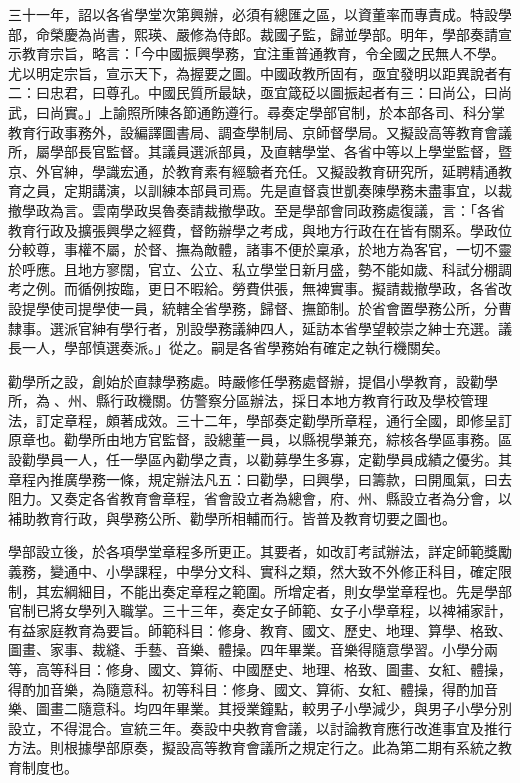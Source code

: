 \begin{pinyinscope}
三十一年，詔以各省學堂次第興辦，必須有總匯之區，以資董率而專責成。特設學部，命榮慶為尚書，熙瑛、嚴修為侍郎。裁國子監，歸並學部。明年，學部奏請宣示教育宗旨，略言：「今中國振興學務，宜注重普通教育，令全國之民無人不學。尤以明定宗旨，宣示天下，為握要之圖。中國政教所固有，亟宜發明以距異說者有二：曰忠君，曰尊孔。中國民質所最缺，亟宜箴砭以圖振起者有三：曰尚公，曰尚武，曰尚實。」上諭照所陳各節通飭遵行。尋奏定學部官制，於本部各司、科分掌教育行政事務外，設編譯圖書局、調查學制局、京師督學局。又擬設高等教育會議所，屬學部長官監督。其議員選派部員，及直轄學堂、各省中等以上學堂監督，暨京、外官紳，學識宏通，於教育素有經驗者充任。又擬設教育研究所，延聘精通教育之員，定期講演，以訓練本部員司焉。先是直督袁世凱奏陳學務未盡事宜，以裁撤學政為言。雲南學政吳魯奏請裁撤學政。至是學部會同政務處復議，言：「各省教育行政及擴張興學之經費，督飭辦學之考成，與地方行政在在皆有關系。學政位分較尊，事權不屬，於督、撫為敵體，諸事不便於稟承，於地方為客官，一切不靈於呼應。且地方寥闊，官立、公立、私立學堂日新月盛，勢不能如歲、科試分棚調考之例。而循例按臨，更日不暇給。勞費供張，無裨實事。擬請裁撤學政，各省改設提學使司提學使一員，統轄全省學務，歸督、撫節制。於省會置學務公所，分曹隸事。選派官紳有學行者，別設學務議紳四人，延訪本省學望較崇之紳士充選。議長一人，學部慎選奏派。」從之。嗣是各省學務始有確定之執行機關矣。

勸學所之設，創始於直隸學務處。時嚴修任學務處督辦，提倡小學教育，設勸學所，為、州、縣行政機關。仿警察分區辦法，採日本地方教育行政及學校管理法，訂定章程，頗著成效。三十二年，學部奏定勸學所章程，通行全國，即修呈訂原章也。勸學所由地方官監督，設總董一員，以縣視學兼充，綜核各學區事務。區設勸學員一人，任一學區內勸學之責，以勸募學生多寡，定勸學員成績之優劣。其章程內推廣學務一條，規定辦法凡五：曰勸學，曰興學，曰籌款，曰開風氣，曰去阻力。又奏定各省教育會章程，省會設立者為總會，府、州、縣設立者為分會，以補助教育行政，與學務公所、勸學所相輔而行。皆普及教育切要之圖也。

學部設立後，於各項學堂章程多所更正。其要者，如改訂考試辦法，詳定師範獎勵義務，變通中、小學課程，中學分文科、實科之類，然大致不外修正科目，確定限制，其宏綱細目，不能出奏定章程之範圍。所增定者，則女學堂章程也。先是學部官制已將女學列入職掌。三十三年，奏定女子師範、女子小學章程，以裨補家計，有益家庭教育為要旨。師範科目：修身、教育、國文、歷史、地理、算學、格致、圖畫、家事、裁縫、手藝、音樂、體操。四年畢業。音樂得隨意學習。小學分兩等，高等科目：修身、國文、算術、中國歷史、地理、格致、圖畫、女紅、體操，得酌加音樂，為隨意科。初等科目：修身、國文、算術、女紅、體操，得酌加音樂、圖畫二隨意科。均四年畢業。其授業鐘點，較男子小學減少，與男子小學分別設立，不得混合。宣統三年。奏設中央教育會議，以討論教育應行改進事宜及推行方法。則根據學部原奏，擬設高等教育會議所之規定行之。此為第二期有系統之教育制度也。


\end{pinyinscope}
